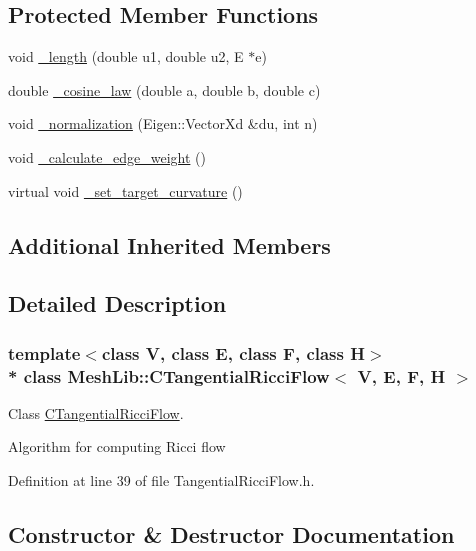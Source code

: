 \subsection*{Protected Member Functions}
\begin{DoxyCompactItemize}
\item 
void \hyperlink{class_mesh_lib_1_1_c_tangential_ricci_flow_a902998c914ca63c77985daeda0a1cddd}{\+\_\+length} (double u1, double u2, E $\ast$e)
\item 
double \hyperlink{class_mesh_lib_1_1_c_tangential_ricci_flow_a5e066ca345120f963a6b859fbb0ac5d8}{\+\_\+cosine\+\_\+law} (double a, double b, double c)
\item 
void \hyperlink{class_mesh_lib_1_1_c_tangential_ricci_flow_a99223f86b1f13d3974c54ce319c212fe}{\+\_\+normalization} (Eigen\+::\+Vector\+Xd \&du, int n)
\item 
void \hyperlink{class_mesh_lib_1_1_c_tangential_ricci_flow_a94dde69c540846106ee0daa7d840e9cb}{\+\_\+calculate\+\_\+edge\+\_\+weight} ()
\item 
virtual void \hyperlink{class_mesh_lib_1_1_c_tangential_ricci_flow_ab7cbb76f7ca0de62311bc9c0cfc281e5}{\+\_\+set\+\_\+target\+\_\+curvature} ()
\end{DoxyCompactItemize}
\subsection*{Additional Inherited Members}


\subsection{Detailed Description}
\subsubsection*{template$<$class V, class E, class F, class H$>$\\*
class Mesh\+Lib\+::\+C\+Tangential\+Ricci\+Flow$<$ V, E, F, H $>$}

Class \hyperlink{class_mesh_lib_1_1_c_tangential_ricci_flow}{C\+Tangential\+Ricci\+Flow}. 

Algorithm for computing Ricci flow 

Definition at line 39 of file Tangential\+Ricci\+Flow.\+h.



\subsection{Constructor \& Destructor Documentation}
